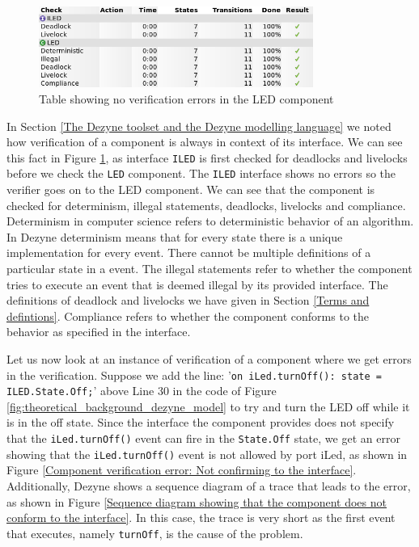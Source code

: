\documentclass[12pt]{scrreprt}
\begin{document}
\begin{figure}
    \centering
    \includegraphics[width=0.8\textwidth]{Figures/theoretical_background/led_verification.png}
    \caption{Table showing no verification errors in the LED component}
    \label{fig:Table showing no verifcation errors in the LED component}
\end{figure}

In Section \ref{The Dezyne toolset and the Dezyne modelling language} we noted how verification of a component is always in context of its interface. We can see this fact in Figure \ref{fig:Table showing no verifcation errors in the LED component}, as interface \texttt{ILED} is first checked for deadlocks and livelocks before we check the \texttt{LED} component. The \texttt{ILED} interface shows no errors so the verifier goes on to the LED component. We can see that the component is checked for determinism, illegal statements, deadlocks, livelocks and compliance. Determinism in computer science refers to deterministic behavior of an algorithm. In Dezyne determinism means that for every state there is a unique implementation for every event. There cannot be multiple definitions of a particular state in a event.
The illegal statements refer to whether the component tries to execute an event that is deemed illegal by its provided interface. The definitions of deadlock and livelocks we have given in Section \ref{Terms and defintions}. Compliance refers to whether the component conforms to the behavior as specified in the interface.
\par
Let us now look at an instance of verification of a component where we get errors in the verification. Suppose we add the line: '\texttt{on iLed.turnOff(): state = ILED.State.Off;}' above Line 30 in the code of Figure \ref{fig:theoretical_background_dezyne_model} to try and turn the LED off while it is in the off state. Since the interface the component provides does not specify that the \texttt{iLed.turnOff()} event can fire in the \texttt{State.Off} state, we get an error showing that the \texttt{iLed.turnOff()} event is not allowed by port iLed, as shown in Figure \ref{Component verification error: Not confirming to the interface}. Additionally, Dezyne shows a sequence diagram of a trace that leads to the error, as shown in Figure \ref{Sequence diagram showing that the component does not conform to the interface}. In this case, the trace is very short as the first event that executes, namely \texttt{turnOff}, is the cause of the problem.
\end{document}
